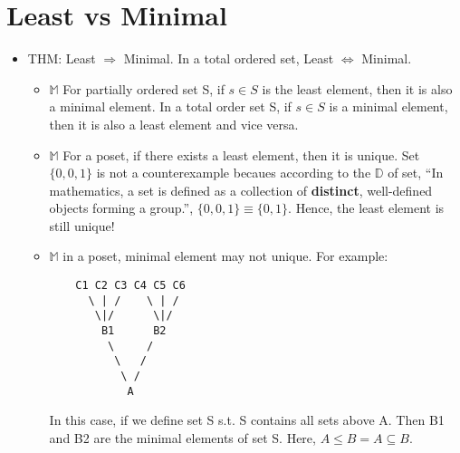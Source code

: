 \documentclass[11pt]{article}
\begin{document}
\section{Least vs Minimal}
\label{sec:orge33806f}
\begin{itemize}
\item THM: Least \(\Rightarrow\) Minimal. In a total ordered set, Least \(\Leftrightarrow\) Minimal.
\begin{itemize}
\item \(\mathbb{M}\) For partially ordered set S, if \(s \in S\) is the least element, then it is also a minimal element. In a total order set S, if \(s \in S\) is a minimal element, then it is also a least element and vice versa.
\item \(\mathbb{M}\) For a poset, if there exists a least element, then it is unique. Set \(\{0, 0, 1\}\) is not a counterexample becaues according to the \(\mathbb{D}\) of set, ``In mathematics, a set is defined as a collection of \textbf{distinct}, well-defined objects forming a group.'', \(\{0, 0, 1\} \equiv \{0, 1\}\). Hence, the least element is still unique!
\item \(\mathbb{M}\) in a poset, minimal element may not unique. For example:\\[0pt]
\begin{verbatim}
    C1 C2 C3 C4 C5 C6
      \ | /    \ | /
       \|/      \|/
        B1      B2
         \     /
          \   /
           \ /
            A
\end{verbatim}
In this case, if we define set S s.t. S contains all sets above A. Then B1 and B2 are the minimal elements of set S. Here, \(A \leq B = A \subseteq B\).
\end{itemize}
\end{itemize}
\end{document}
